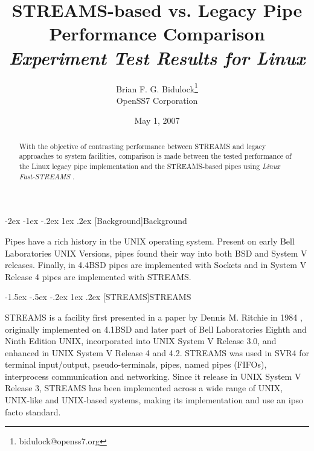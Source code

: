 \documentclass[letterpaper,final,notitlepage,twocolumn,10pt,twoside]{article}
\makeatletter
\renewcommand\section{\@startsection {section}{1}{\z@}%
                                   {-2ex \@plus -1ex \@minus -.2ex}%
                                   {1ex \@plus .2ex}%
                                   {\normalfont\large\bfseries}}
\renewcommand\subsection{\@startsection{subsection}{2}{\z@}%
                                     {-1.5ex \@plus -.5ex \@minus -.2ex}%
                                     {1ex \@plus .2ex}%
                                     {\normalfont\normalsize\bfseries}}
\makeatother
\begin{document}

\title{STREAMS-based vs. Legacy Pipe Performance Comparison\\[0.5ex]
	{\large \textsl{Experiment Test Results for Linux}}}
\author{Brian F. G. Bidulock\thanks{bidulock@openss7.org}\\
	OpenSS7 Corporation}
\date{May 1, 2007}
\maketitle

\begin{abstract}
With the objective of contrasting performance between STREAMS and legacy
approaches to system facilities, comparison is made between the tested
performance of the Linux legacy pipe implementation and the STREAMS-based
pipes using \textsl{Linux Fast-STREAMS} \cite[]{LfS}.
\end{abstract}


\section[Background]{Background}

Pipes have a rich history in the UNIX operating system.  Present on early Bell
Laboratories UNIX Versions, pipes found their way into both BSD and System V
releases.  Finally, in 4.4BSD pipes are implemented with Sockets and in System
V Release 4 pipes are implemented with STREAMS.

\subsection[STREAMS]{STREAMS}

STREAMS is a facility first presented in a paper by Dennis M. Ritchie in 1984
\cite[]{Ritchie84}, originally implemented on 4.1BSD and later part of Bell
Laboratories Eighth and Ninth Edition UNIX, incorporated into UNIX System V
Release 3.0, and enhanced in UNIX System V Release 4 and 4.2.  STREAMS was
used in SVR4 for terminal input/output, pseudo-terminals, pipes, named pipes
(FIFOs), interprocess communication and networking.  Since it release in UNIX
System V Release 3, STREAMS has been implemented across a wide range of UNIX,
UNIX-like and UNIX-based systems, making its implementation and use an ipso
facto standard.
\end{document}
